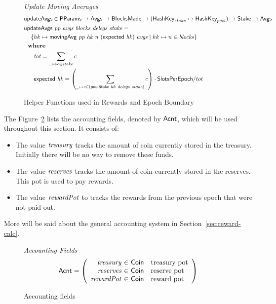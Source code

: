 \begin{figure}[htb]
  \emph{Update Moving Averages}
  \begin{align*}
      & \fun{updateAvgs} \in \PParams \to \Avgs \to \BlocksMade \to
          (\HashKey_{stake}\mapsto \HashKey_{pool}) \to \Stake \to \Avgs \\
      & \updateAvgs{pp}{avgs}{blocks}{delegs}{stake} = \\
      & ~~~ \left\{hk\mapsto \movingAvg{pp}{hk}{n}{(\fun{expected}~hk)}{avgs}
            \mid
            hk\mapsto n\in\var{blocks}
            \right\} \\
      & \where \\
      & ~~~~~ \var{tot} = \sum_{\_\mapsto c\in \var{stake}}c \\
      & ~~~~~ \fun{expected}~\var{hk} =
                  \left(\sum\limits_{
                    \wcard\mapsto c\in\var{(\poolStake{hk}{delegs}{stake}})}c
                  \right) \cdot\SlotsPerEpoch / tot
  \end{align*}

  \caption{Helper Functions used in Rewards and Epoch Boundary}
  \label{fig:funcs:epoch-helper}
\end{figure}


The Figure~\ref{fig:defs:accounting} lists the accounting fields, denoted by $\mathsf{Acnt}$,
which will be used throughout this section. It consists of:
\begin{itemize}
  \item The value $\mathit{treasury}$ tracks the amount of coin currently stored in the treasury.
    Initially there will be no way to remove these funds.
  \item The value $\mathit{reserves}$ tracks the amount of coin currently stored in the reserves.
    This pot is used to pay rewards.
  \item The value $\mathit{rewardPot}$ to tracks the rewards from the previous epoch that were not
    paid out.
\end{itemize}
More will be said about the general accounting system in Section~\ref{sec:reward-calc}.

\begin{figure}[htb]
  \emph{Accounting Fields}
  \begin{equation*}
    \Acnt =
    \left(
      \begin{array}{r@{~\in~}ll}
        \var{treasury} & \Coin & \text{treasury pot}\\
        \var{reserves} & \Coin & \text{reserve pot}\\
        \var{rewardPot} & \Coin & \text{reward pot}\\
      \end{array}
    \right)
  \end{equation*}
  \caption{Accounting fields}
  \label{fig:defs:accounting}
\end{figure}


